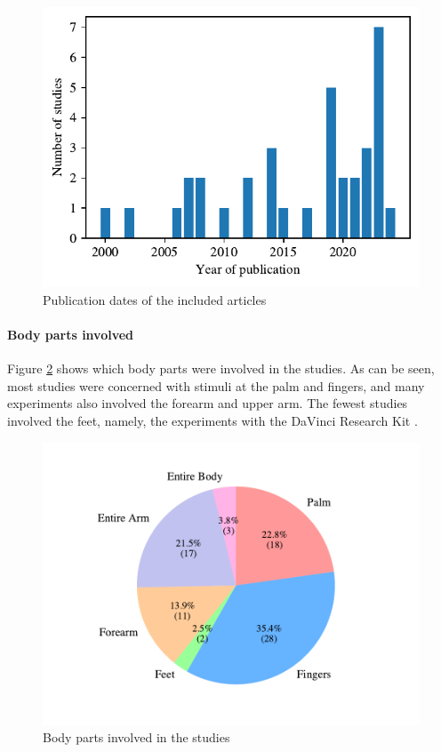 \begin{figure}[htbp]
    \centering
    \includegraphics[width=\columnwidth]{figures/years.pdf} 
    \caption{Publication dates of the included articles}
    \label{fig:years}
\end{figure} 




\paragraph{Body parts involved}

Figure \ref{fig:body_parts_pie} shows which body parts were involved in the studies. As can be seen, most studies were concerned with stimuli at the palm and fingers, and many experiments also involved the forearm and upper arm. The fewest studies involved the feet, namely, the experiments with the DaVinci Research Kit \cite{Caccianiga2021, Oquendo2024}.

\begin{figure}[htbp]
    \centering
    \includegraphics[width=\columnwidth]{figures/body_pie.pdf} 
    \caption{Body parts involved in the studies}
    \label{fig:body_parts_pie}
\end{figure} 


